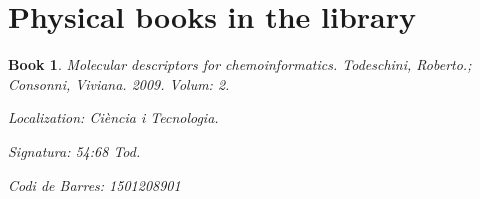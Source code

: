 \documentclass[12pt,letterpaper]{article}
\newtheorem{book}{Book}
\begin{document}

\section{Physical books in the library}
\begin{book}
Molecular descriptors for chemoinformatics. Todeschini, Roberto.; Consonni, Viviana. 2009. Volum: 2. 

Localization: Ciència i Tecnologia. 

Signatura: 54:68 Tod. 

Codi de Barres: 1501208901
\end{book}

\end{document}
